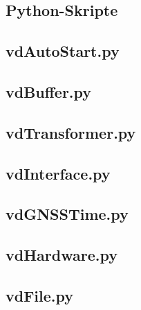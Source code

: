 \documentclass[a4paper,12pt,bibliography=totoc, listof=totoc,titlepage,pointlessnumbers]{scrreprt}
\begin{document}
\renewcommand{\appendixpagename}{\appendixname} 
\renewcommand{\appendixtocname}{\appendixname} 
\begin{appendices}

\chapter{Python-Skripte}
\label{a:skripte}
\section{vdAutoStart.py}
\label{a:vdAutoStart.py}


\section{vdBuffer.py}
\label{a:vdBuffer.py}


\section{vdTransformer.py}
\label{a:vdTransformer.py}


\section{vdInterface.py}
\label{a:vdInterface.py}


\section{vdGNSSTime.py}
\label{a:vdGNSSTime.py}


\section{vdHardware.py}
\label{a:vdHardware.py}


\section{vdFile.py}
\label{a:vdFile.py}



\end{appendices}
\end{document}
